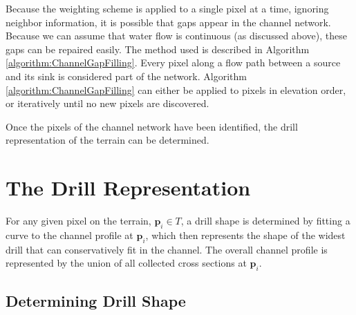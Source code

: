 Because the weighting scheme is applied to a single pixel at a time, ignoring neighbor information, it is possible that gaps appear in the channel network. Because we can assume that water flow is continuous (as discussed above), these gaps can be repaired easily. The method used is described in Algorithm \ref{algorithm:ChannelGapFilling}. Every pixel along a flow path between a source and its sink is considered part of the network.
% 
Algorithm \ref{algorithm:ChannelGapFilling} can either be applied to pixels in elevation order, or iteratively until no new pixels are discovered. 

Once the pixels of the channel network have been identified, the drill representation of the terrain can be determined.

\section{The Drill Representation}

For any given pixel on the terrain, $\textbf{p}_{i} \in T$, a drill shape is determined by fitting a curve to the channel profile at $\textbf{p}_{i}$, which then represents the shape of the widest drill that can conservatively fit in the channel.
The overall channel profile is represented by the union of all collected cross sections at $\textbf{p}_{i}$.


\subsection{Determining Drill Shape}

